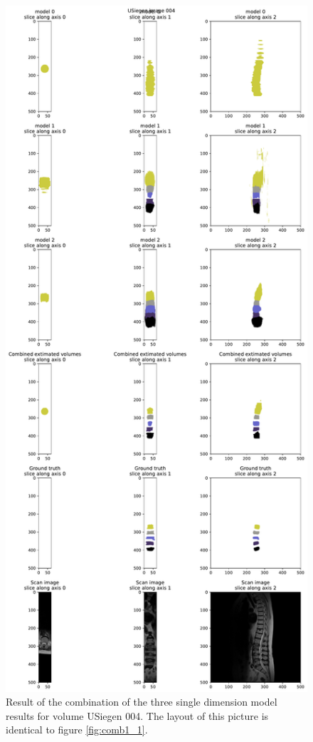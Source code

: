 \begin{figure}
    \centering
    \includegraphics[width=.95\textwidth]{images/comb1_denoise2_erode1_USiegen_004.pdf}
    \caption{
        Result of the combination of the three single dimension model results for volume USiegen 004. The layout of this picture is identical to figure \ref{fig:comb1_1}.\label{fig:comb1_3}
    }
\end{figure}

